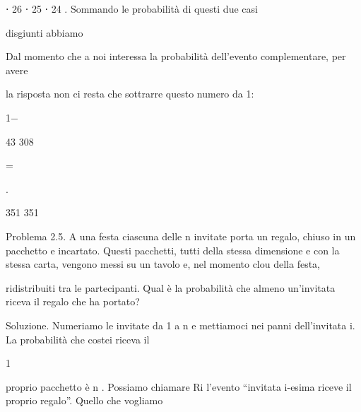 \documentclass[a4paper,portrait,12pt]{article}
\begin{document}
\begin{flushleft}
⋅ 26 ⋅ 25 ⋅ 24 . Sommando le probabilit\`{a} di questi due casi
\end{flushleft}





\begin{flushleft}
disgiunti abbiamo
\end{flushleft}


\begin{flushleft}
Dal momento che a noi interessa la probabilit\`{a} dell'evento complementare, per avere
\end{flushleft}


\begin{flushleft}
la risposta non ci resta che sottrarre questo numero da 1:
\end{flushleft}


1$-$





43 308


=


.


351 351





\begin{flushleft}
Problema 2.5. A una festa ciascuna delle n invitate porta un regalo, chiuso in un pacchetto e incartato. Questi pacchetti, tutti della stessa dimensione e con la stessa carta, vengono messi su un tavolo e, nel momento clou della festa,
\end{flushleft}


\begin{flushleft}
ridistribuiti tra le partecipanti. Qual \`{e} la probabilit\`{a} che almeno un'invitata riceva il regalo che ha portato?
\end{flushleft}


\begin{flushleft}
Soluzione. Numeriamo le invitate da 1 a n e mettiamoci nei panni dell'invitata i. La probabilit\`{a} che costei riceva il
\end{flushleft}


1


\begin{flushleft}
proprio pacchetto \`{e} n . Possiamo chiamare Ri l'evento {``}invitata i-esima riceve il proprio regalo''. Quello che vogliamo
\end{flushleft}
\end{document}
